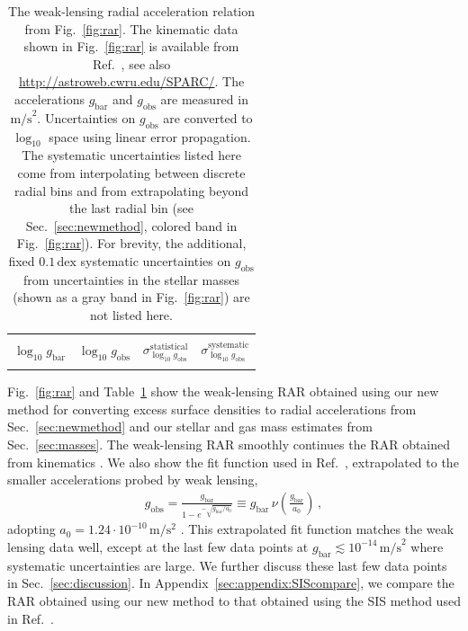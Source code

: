 \documentclass[a4paper,11pt]{article}
\newcommand{\gobs}{\ensuremath{g_{\mathrm{obs}}}}
\newcommand{\gbar}{\ensuremath{g_{\mathrm{bar}}}}
\begin{document}
\begin{table}
\caption{
  The weak-lensing radial acceleration relation from Fig.~\ref{fig:rar}.
  The kinematic data shown in Fig.~\ref{fig:rar} is available from Ref.~\cite{Lelli2017b}, see also \url{http://astroweb.cwru.edu/SPARC/}.
  The accelerations $\gbar$ and $\gobs$ are measured in $\mathrm{m/s}^2$. Uncertainties on $\gobs$ are converted to $\log_{10}$ space using linear error propagation.
  The systematic uncertainties listed here come from interpolating between discrete radial bins and from extrapolating beyond the last radial bin (see Sec.~\ref{sec:newmethod}, colored band in Fig.~\ref{fig:rar}).
  For brevity, the additional, fixed $0.1\,\mathrm{dex}$ systematic uncertainties on $\gobs$ from uncertainties in the stellar masses (shown as a gray band in Fig.~\ref{fig:rar}) are not listed here.
}
\label{table:rar}
\centering
\begin{tabular}{c c c c}
\\[-0.5em] %
\hline\hline
\\[-0.9em] %
$\log_{10} \gbar$&
$\log_{10} \gobs$&
$\sigma_{\log_{10} \gobs}^{\mathrm{statistical}}$ &
$\sigma_{\log_{10} \gobs}^{\mathrm{systematic}}$
\\
\hline
\\[-0.9em] %

\hline
\end{tabular}
\end{table}

Fig.~\ref{fig:rar} and Table~\ref{table:rar} show the weak-lensing RAR obtained using our new method for converting excess surface densities to radial accelerations from Sec.~\ref{sec:newmethod} and our stellar and gas mass estimates from Sec.~\ref{sec:masses}.
The weak-lensing RAR smoothly continues the RAR obtained from kinematics \citep{Lelli2017b}.
We also show the fit function used in Ref.~\cite{Lelli2017b}, extrapolated to the smaller accelerations probed by weak lensing,
\begin{align}
\label{eq:nufunction}
g_{\mathrm{obs}} = \frac{g_{\mathrm{bar}}}{1 - e^{-\sqrt{g_{\mathrm{bar}}/a_0}}} \equiv g_{\mathrm{bar}} \, \nu\left(\frac{g_{\mathrm{bar}}}{a_0}\right) \,,
\end{align}
adopting $a_0 = 1.24\cdot 10^{-10}\,\mathrm{m}/\mathrm{s}^2$ \citep{McGaugh2011}.
This extrapolated fit function matches the weak lensing data well, except at the last few data points at $g_{\mathrm{bar}} \lesssim 10^{-14}\,\mathrm{m/s}^2$ where systematic uncertainties are large.
We further discuss these last few data points in Sec.~\ref{sec:discussion}.
In Appendix~\ref{sec:appendix:SIScompare}, we compare the RAR obtained using our new method to that obtained using the SIS method used in Ref.~\cite{Brouwer2021}.
\end{document}
